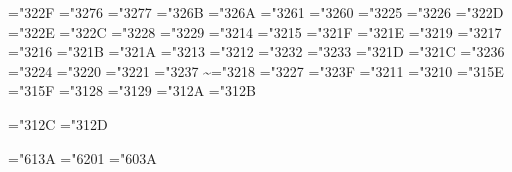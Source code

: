 \mathchardef\propto="322F
\mathchardef\sqsubseteq="3276
\mathchardef\sqsupseteq="3277
\mathchardef\parallel="326B
\mathchardef\mid="326A
\mathchardef\dashv="3261
\mathchardef\vdash="3260
\mathchardef\nearrow="3225
\mathchardef\searrow="3226
\mathchardef\nwarrow="322D
\mathchardef\swarrow="322E
\mathchardef\Leftrightarrow="322C
\mathchardef\Leftarrow="3228
\mathchardef\Rightarrow="3229
\def\neq{\not=} \let\ne=\neq
\mathchardef\leq="3214 \let\le=\leq
\mathchardef\geq="3215 \let\ge=\geq
\mathchardef\succ="321F
\mathchardef\prec="321E
\mathchardef\approx="3219
\mathchardef\succeq="3217
\mathchardef\preceq="3216
\mathchardef\supset="321B
\mathchardef\subset="321A
\mathchardef\supseteq="3213
\mathchardef\subseteq="3212
\mathchardef\in="3232
\mathchardef\ni="3233 \let\owns=\ni
\mathchardef\gg="321D
\mathchardef\ll="321C
\mathchardef\not="3236
\mathchardef\leftrightarrow="3224
\mathchardef\leftarrow="3220 \let\gets=\leftarrow
\mathchardef\rightarrow="3221 \let\to=\rightarrow
\mathchardef\mapstochar="3237 \def\mapsto{\mapstochar\rightarrow}
\mathchardef\sim="3218
\mathchardef\simeq="3227
\mathchardef\perp="323F
\mathchardef\equiv="3211
\mathchardef\asymp="3210
\mathchardef\smile="315E
\mathchardef\frown="315F
\mathchardef\leftharpoonup="3128
\mathchardef\leftharpoondown="3129
\mathchardef\rightharpoonup="312A
\mathchardef\rightharpoondown="312B

\def\joinrel{\mathrel{\mkern-3mu}}
\def\relbar{\mathrel{\smash-}} %
\def\Relbar{\mathrel=}
\mathchardef\lhook="312C \def\hookrightarrow{\lhook\joinrel\rightarrow}
\mathchardef\rhook="312D \def\hookleftarrow{\leftarrow\joinrel\rhook}
\def\bowtie{\mathrel\triangleright\joinrel\mathrel\triangleleft}
\def\models{\mathrel|\joinrel=}
\def\Longrightarrow{\Relbar\joinrel\Rightarrow}
\def\longrightarrow{\relbar\joinrel\rightarrow}
\def\longleftarrow{\leftarrow\joinrel\relbar}
\def\Longleftarrow{\Leftarrow\joinrel\Relbar}
\def\longmapsto{\mapstochar\longrightarrow}
\def\longleftrightarrow{\leftarrow\joinrel\rightarrow}
\def\Longleftrightarrow{\Leftarrow\joinrel\Rightarrow}
\def\iff{\;\Longleftrightarrow\;}

\mathchardef\ldotp="613A %
\mathchardef\cdotp="6201 %
\mathchardef\colon="603A %
\def\ldots{\mathinner{\ldotp\ldotp\ldotp}}
\def\cdots{\mathinner{\cdotp\cdotp\cdotp}}
\def\vdots{\vbox{\baselineskip4pt \lineskiplimit\z@
    \kern6pt\hbox{.}\hbox{.}\hbox{.}}}
\def\ddots{\mathinner{\mkern1mu\raise7pt\vbox{\kern7pt\hbox{.}}\mkern2mu
    \raise4pt\hbox{.}\mkern2mu\raise1pt\hbox{.}\mkern1mu}}

